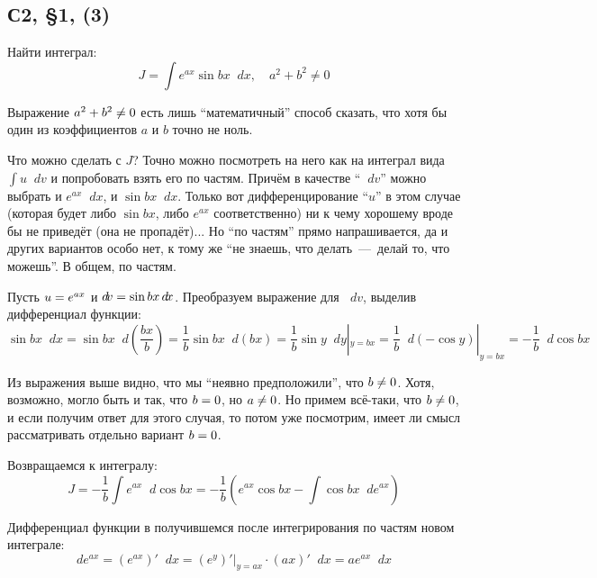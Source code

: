 \documentclass[a4paper,12pt]{article}
\newcommand{\diff}{\mathop{}\!d\!}
\begin{document}
  
  \subsection{С2, \S 1, (3)}
  
  Найти интеграл:
  \[
    J = \int e^{ax} \sin{bx} \diff x,\quad a^2 + b^2 \not= 0
  \]
  
  \begin{solution}
    Выражение $a^2 \hm+ b^2 \hm{\not=} 0$ есть лишь ``математичный'' способ сказать, что хотя бы один из коэффициентов $a$ и $b$ точно не ноль.
    
    Что можно сделать с $J$?
    Точно можно посмотреть на него как на интеграл вида $\int u \diff v$ и попробовать взять его по частям.
    Причём в качестве ``$\diff v$'' можно выбрать и $e^{ax} \diff x$, и $\sin{bx} \diff x$.
    Только вот дифференцирование ``$u$'' в этом случае (которая будет либо $\sin{bx}$, либо $e^{ax}$ соответственно) ни к чему хорошему вроде бы не приведёт (она не пропадёт)...
    Но ``по частям'' прямо напрашивается, да и других вариантов особо нет, к тому же ``не знаешь, что делать~---~делай то, что можешь''.
    В общем, по частям.
    
    Пусть $u \hm= e^{ax}$ и $\diff v \hm= \sin{bx} \diff x$.
    Преобразуем выражение для $\diff v$, выделив дифференциал функции:
    \begin{equation}\label{eq:2-1-24(3)-sinbxdx}
      \sin{bx} \diff x
        = \sin{bx} \diff \left(\frac{bx}{b}\right)
        = \frac{1}{b} \sin{bx} \diff (bx)
        = \frac{1}{b} \sin y \diff y|_{y = bx}
        = \frac{1}{b} \diff (-\cos y)|_{y = bx}
        = -\frac{1}{b} \diff \cos{bx}
    \end{equation}
    
    Из выражения выше видно, что мы ``неявно предположили'', что $b \hm{\not=} 0$.
    Хотя, возможно, могло быть и так, что $b \hm= 0$, но $a \hm{\not=} 0$.
    Но примем всё-таки, что $b \hm{\not=} 0$, и если получим ответ для этого случая, то потом уже посмотрим, имеет ли смысл рассматривать отдельно вариант $b \hm= 0$.

    Возвращаемся к интегралу:
    \[
      J = -\frac{1}{b} \int e^{ax} \diff \cos{bx}
        = -\frac{1}{b} \left(e^{ax} \cos{bx} - \int \cos{bx} \diff e^{ax}\right)
    \]
    
    Дифференциал функции в получившемся после интегрирования по частям новом интеграле:
    \begin{equation}\label{eq:2-1-24(3)-deax}
      de^{ax} = \left(e^{ax}\right)' \diff x = \left(e^{y}\right)'|_{y = ax} \cdot (ax)' \diff x = a e^{ax} \diff x
    \end{equation}
    

\end{solution}
\end{document}
